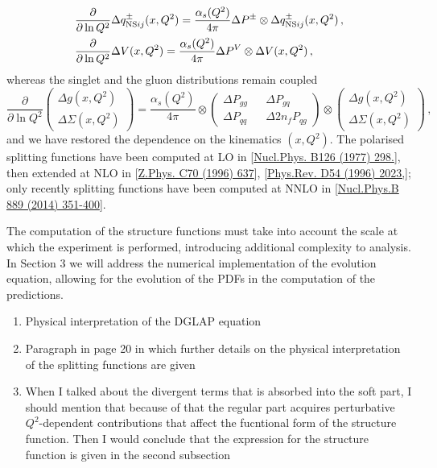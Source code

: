 \begin{equation}
  \begin{split}
    & \frac{\partial}{\partial \ln Q^2}\Delta q_{\textrm{NS}ij}^{\pm} (x,Q^2) = \frac{\alpha_s(Q^2)}{4\pi} \Delta P^{\pm} \otimes \Delta q_{{\textrm{NS}ij}}^{\pm} (x,Q^2) \,, \\
    & \frac{\partial}{\partial \ln Q^2}\Delta V (x,Q^2) = \frac{\alpha_s(Q^2)}{4\pi} \Delta P^{V} \otimes \Delta V (x,Q^2)\,,
  \end{split}
\end{equation}
whereas the singlet and the gluon distributions remain coupled 
\begin{equation}
  \frac{\partial}{\partial \ln Q^2} 
  \left(\begin{matrix}
    \Delta g (x,Q^2)\\
    \Delta \Sigma (x,Q^2)
  \end{matrix} \right) 
  = \frac{\alpha_{s}(Q^2)}{4 \pi} \otimes
  \left(\begin{matrix}
    \Delta P_{gg} && \Delta P_{gq} \\
    \Delta P_{qq} && \Delta 2n_f P_{qg}
  \end{matrix} \right)
  \otimes 
  \left(\begin{matrix}
    \Delta g (x,Q^2) \\
    \Delta \Sigma (x,Q^2)
  \end{matrix} \right) \,,
\end{equation}
and we have restored the dependence on the kinematics $(x,Q^2)$. The polarised splitting functions have been computed at LO in [\href{https://www.sciencedirect.com/science/article/abs/pii/0550321377903844?via%3Dihub}{Nucl.Phys. B126 (1977) 298.}], then extended at NLO in [\href{http://dx.doi.org/10.1007/s002880050138}{Z.Phys. C70 (1996) 637}], [\href{http://dx.doi.org/10.1103/PhysRevD.54.2023}{Phys.Rev. D54 (1996) 2023,}]; only recently splitting functions have been computed at NNLO in [\href{https://inspirehep.net/literature/1317880}{Nucl.Phys.B 889 (2014) 351-400}].\par
The computation of the structure functions must take into account the scale at which the experiment is performed, introducing additional complexity to analysis. In Section 3 we will address the numerical implementation of the evolution equation, allowing for the evolution of the PDFs in the computation of the predictions.\par
{}
\begin{enumerate}
  \item Physical interpretation of the DGLAP equation\\
  \item Paragraph in page 20 in which further details on the physical interpretation of the splitting functions are given
  \item When I talked about the divergent terms that is absorbed into the soft part, I should mention that because of that the regular part acquires perturbative $Q^2$-dependent contributions that affect the fucntional form of the structure function. Then I would conclude that the expression for the structure function is given in the second subsection
\end{enumerate}
